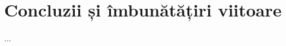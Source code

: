 \chapter{Concluzii și îmbunătățiri viitoare}
\label{Concluzii și îmbunătățiri viitoare}
...
\newpage